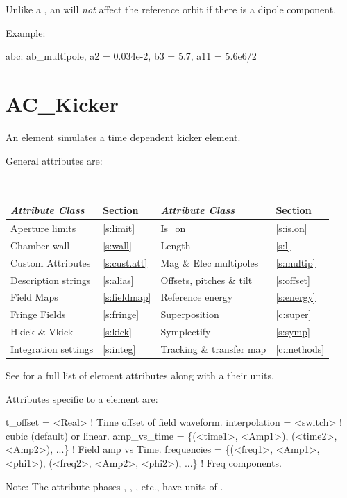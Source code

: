 Unlike a , an  will {\em not} affect the reference orbit if there is
a dipole component.

Example:
\begin{example}
  abc: ab_multipole, a2 = 0.034e-2, b3 = 5.7, a11 = 5.6e6/2
\end{example}

\newpage

\section{AC_Kicker}
\label{s:ac.kick}

An  element simulates a time dependent kicker element.

General  attributes are:
\begin{center}
\tt
\begin{tabular}{llll} \toprule
  {\sl Attribute Class}      & Section           & {\sl Attribute Class}      & Section         \\ \midrule
  Aperture limits            & \ref{s:limit}     & Is_on                      & \ref{s:is.on}   \\
  Chamber wall               & \ref{s:wall}      & Length                     & \ref{s:l}       \\
  Custom Attributes          & \ref{s:cust.att}  & Mag \& Elec multipoles     & \ref{s:multip}  \\
  Description strings        & \ref{s:alias}     & Offsets, pitches \& tilt   & \ref{s:offset}  \\
  Field Maps                 & \ref{s:fieldmap}  & Reference energy           & \ref{s:energy}  \\ 
  Fringe Fields              & \ref{s:fringe}    & Superposition              & \ref{c:super}   \\
  Hkick \& Vkick             & \ref{s:kick}      & Symplectify                & \ref{s:symp}    \\
  Integration settings       & \ref{s:integ}     & Tracking \& transfer map   & \ref{c:methods} \\
  \bottomrule
\end{tabular}
\end{center}
\toffset
See  for a full list of element attributes along with a their units.

Attributes specific to a  element are:
\begin{example}
  t_offset        = <Real>              ! Time offset of field waveform.
  interpolation   = <switch>            ! cubic (default) or linear.
  amp_vs_time = \{(<time1>, <Amp1>), (<time2>, <Amp2>), ...\}  ! Field amp vs Time.
  frequencies = \{(<freq1>, <Amp1>, <phi1>), 
                              (<freq2>, <Amp2>, <phi2>), ...\} ! Freq components.
\end{example}
Note: The  attribute phases , , , etc., have units of
.

